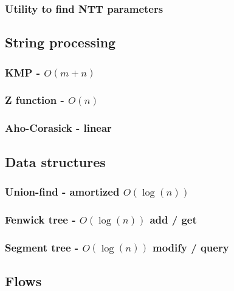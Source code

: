 \documentclass[landscape,a4paper,twocolumn,10pt]{report}
\begin{document}
\subsubsection{Utility to find NTT parameters}




\subsection*{String processing}
\label{string}

\subsubsection{KMP - $O(m+n)$}


\subsubsection{Z function - $O(n)$}


\subsubsection{Aho-Corasick - linear}



\subsection*{Data structures}
\label{datastruct}

\subsubsection{Union-find - amortized $O(\log(n))$}


\subsubsection{Fenwick tree - $O(\log(n))$ add / get}


\subsubsection{Segment tree - $O(\log(n))$ modify / query}


\subsection*{Flows}
\label{flows}
\end{document}
